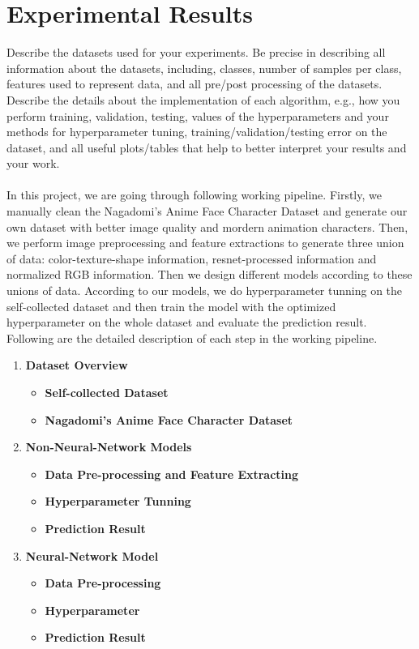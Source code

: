 \documentclass[11.5pt]{article}
\begin{document}
\section{Experimental Results}
Describe the datasets used for your experiments. Be precise in describing all information about the datasets, including, classes, number of samples per class, features used to represent data, and all pre/post processing of the datasets.\\
Describe the details about the implementation of each algorithm, e.g., how you perform training, validation, testing, values of the hyperparameters and your methods for hyperparameter tuning, training/validation/testing error on the dataset, and all useful plots/tables that help to better interpret your results and your work.\\ \\
In this project, we are going through following working pipeline. Firstly, we manually clean the Nagadomi's Anime Face Character Dataset and generate our own dataset with better image quality and mordern animation characters. Then, we perform image preprocessing and feature extractions to generate three union of data: color-texture-shape information, resnet-processed information and normalized RGB information. Then we design different models according to these unions of data. According to our models, we do hyperparameter tunning on the self-collected dataset and then train the model with the optimized hyperparameter on the whole dataset and evaluate the prediction result. Following are the detailed description of each step in the working pipeline.

\begin{enumerate}
    \item \textbf{Dataset Overview}
        \begin{itemize}
            \item \textbf{Self-collected Dataset}
            \item \textbf{Nagadomi’s Anime Face Character Dataset}
        \end{itemize}
    \item \textbf{Non-Neural-Network Models}
        \begin{itemize}
            \item \textbf{Data Pre-processing and Feature Extracting}
            \item \textbf{Hyperparameter Tunning}
            \item \textbf{Prediction Result}
        \end{itemize}
    \item \textbf{Neural-Network Model}
        \begin{itemize}
            \item \textbf{Data Pre-processing}
            \item \textbf{Hyperparameter}
            \item \textbf{Prediction Result}
        \end{itemize}
\end{enumerate}
\end{document}
